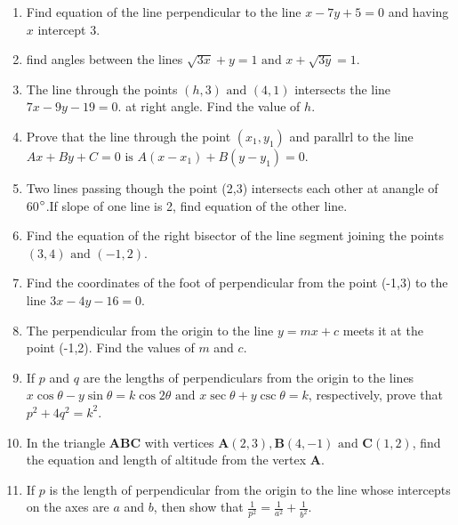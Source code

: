 \documentclass[12pt]{article}
\let\vec\mathbf
\begin{document}
\begin{enumerate}
\item Find equation of the line perpendicular to the line $x-7y+5=0$ and having $x$ intercept 3.
\item find angles between the lines $\sqrt{3x}+y=1 \text{ and }x+\sqrt{3y}=1$.
\item The line through the points $(h,3)\text{ and }(4,1)$ intersects the line $7x-9y-19=0$. at right angle. Find the value of $h$.
\item Prove that the line through the point $(x_1,y_1)$ and parallrl to the line $ Ax+By+C=0 \text{ is } A(x-x_1)+B(y-y_1)=0$.
\item Two lines passing though the point (2,3) intersects each other at anangle of 60$\degree$.If slope of one line is 2, find equation of the other line.
\item Find the equation of the right bisector of the line segment joining the points $(3,4)\text{ and }(-1,2)$.
\item Find the coordinates of the foot of perpendicular from the point (-1,3) to the line $3x-4y-16=0$.
\item The perpendicular from the origin to the line $y=mx+c$ meets it at the point (-1,2). Find the values of $m$ and $c$.
\item If $p$ and $q$ are the lengths of perpendiculars from the origin to the lines $x\cos{\theta}-y\sin{\theta}=k\cos{2\theta}\text{ and } x\sec{\theta}+y\csc{\theta}=k $, respectively, prove that $p^2+4q^2=k^2$.
\item In the triangle $\vec{ABC}$ with vertices $\vec{A}(2,3),\vec{B}(4,-1)\text{ and }\vec{C}(1,2)$, find the equation and length of altitude from the vertex $\vec{A}$.
\item If $p$ is the length of perpendicular from the origin to the line whose intercepts on the axes are $a$ and $b$, then show that $\frac{1}{p^2}=\frac{1}{a^2}+\frac{1}{b^2}$.
\end{enumerate}
\end{document}
